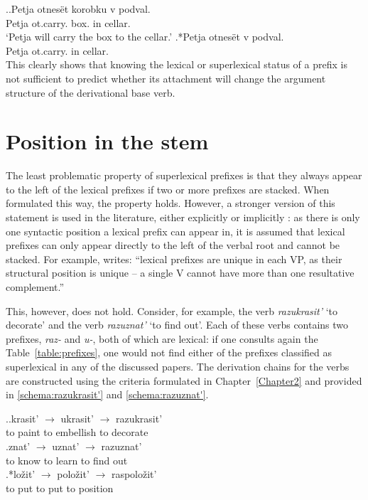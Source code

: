 \ex.\label{ex:otnesti}\ag.Petja otnes\"{e}t\textsuperscript{\PF} korobku v podval.\\
Petja ot.carry. box. in cellar.\\
\trans `Petja will carry the box to the cellar.'
\bg.*Petja otnes\"{e}t\textsuperscript{\PF} v podval.\\
Petja ot.carry. in cellar.\\

This clearly shows that knowing the lexical or superlexical status of a prefix is not sufficient to predict whether its attachment will change the argument structure of the derivational base verb.
\section{Position in the stem}\label{section:new:position}
The least problematic property of superlexical prefixes is that they always appear to the left of the lexical prefixes if two or more prefixes are stacked. When formulated this way, the property holds. However, a stronger version of this statement is used in the literature, either explicitly \citep{Svenonius:04b} or implicitly \citep{Tatevosov:09}: as there is only one syntactic position a lexical prefix can appear in, it is assumed that lexical prefixes can only appear directly to the left of the verbal root and cannot be stacked. For example, \citet[206]{Svenonius:04b} writes: ``lexical prefixes are unique in each VP, as their structural position is unique -- a single V cannot have more than one resultative complement.''


This, however, does not hold. Consider, for example, the verb \textit{razukrasit'} `to decorate' and the verb \textit{razuznat'} `to find out'. Each of these verbs contains two prefixes, \textit{raz-} and \textit{u-}, both of which are lexical: if one consults again the Table~\ref{table:prefixes}, one would not find either of the prefixes classified as superlexical in any of the discussed papers. The derivation chains for the verbs are constructed using the criteria formulated in Chapter~\ref{Chapter2} and provided in \ref{schema:razukrasit'} and \ref{schema:razuznat'}.

\ex.\ag.\label{schema:razukrasit'}krasit'\textsuperscript{\IPF} {$\rightarrow$} ukrasit'\textsuperscript{\PF} {$\rightarrow$} razukrasit'\textsuperscript{\PF}\\
{to paint} {} {to embellish} {} {to decorate}\\
\bg.\label{schema:razuznat'}znat'\textsuperscript{\IPF} {$\rightarrow$} uznat'\textsuperscript{\PF} {$\rightarrow$} razuznat'\textsuperscript{\PF}\\
{to know} {} {to learn} {} {to find out}\\
\bg.*lo\v{z}it'\textsuperscript{\IPF} {$\rightarrow$} polo\v{z}it'\textsuperscript{\PF} {$\rightarrow$} raspolo\v{z}it'\textsuperscript{\PF}\label{schema:raspolozit'}\\
{to put} {} {to put} {} {to position}\\

